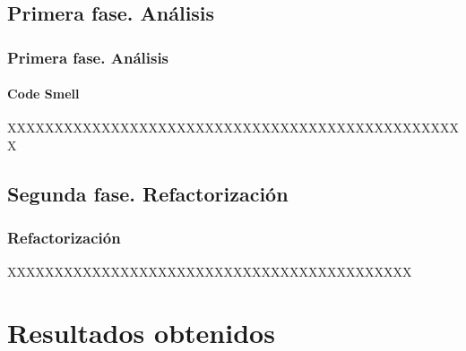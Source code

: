 \documentclass{beamer}
\begin{document}
\subsection{Primera fase. Análisis}
\begin{frame}
\frametitle{Primera fase. Análisis}
\framesubtitle{Code Smell}
  
  XXXXXXXXXXXXXXXXXXXXXXXXXXXXXXXXXXXXXXXXXXXXXXXXX
  
\end{frame}
\subsection{Segunda fase. Refactorización}
\begin{frame}
\frametitle{Refactorización}

  XXXXXXXXXXXXXXXXXXXXXXXXXXXXXXXXXXXXXXXXXXX

\end{frame}




\section{Resultados obtenidos}
\end{document}
